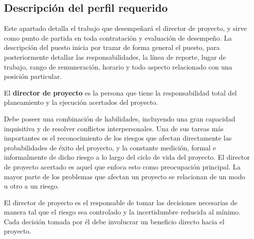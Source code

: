 \subsection{Descripción del perfil requerido}

Este apartado detalla el trabajo que desempeñará el director de proyecto, y sirve como punto de partida en toda contratación y evaluación de desempeño.
La descripción del puesto inicia por trazar de forma general el puesto, para posteriormente detallar las responsabilidades, la línea de reporte, lugar de trabajo, rango de remuneración, horario y todo aspecto relacionado con una posición particular.

El \textbf{director de proyecto} es la persona que tiene la responsabilidad total del planeamiento y la ejecución acertados del proyecto.

Debe poseer una combinación de habilidades, incluyendo una gran capacidad inquisitiva y de resolver conflictos interpersonales.
Una de sus tareas más importantes es el reconocimiento de los riesgos que afectan directamente las probabilidades de éxito del proyecto, y la constante medición, formal e informalmente de dicho riesgo a lo largo del ciclo de vida del proyecto.
El director de proyecto acertado es aquel que enfoca esto como preocupación principal.
La mayor parte de los problemas que afectan un proyecto se relacionan de un modo u otro a un riesgo.

El director de proyecto es el responsable de tomar las decisiones necesarias de manera tal que el riesgo sea controlado y la incertidumbre reducida al mínimo.
Cada decisión tomada por él debe involucrar un beneficio directo hacia el proyecto.

